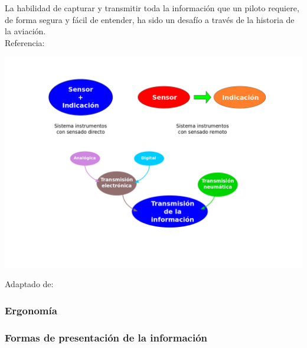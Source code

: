 \begin{frame}
  
  \begin{alertblock}{}
    La habilidad de capturar y transmitir toda la informaci\'on que un piloto requiere, de forma segura y f\'acil de entender, ha sido un desaf\'io a trav\'es de la historia de la aviaci\'on.\\
{\tiny Referencia:  \cite{FAA_hdk_aMThA_v2}}
  \end{alertblock}

        \includegraphics[width=\textwidth]{tikz/01_sistema_instrumentos.png}

        {\tiny Adaptado de: \cite{FAA_hdk_aMThA_v2}}







\end{frame}

\subsubsection{Ergonom\'ia}
\label{sec:ergonomia}




\subsubsection{Formas de presentaci\'on de la informaci\'on}
\label{sec:formas.presentacion.informacion}

